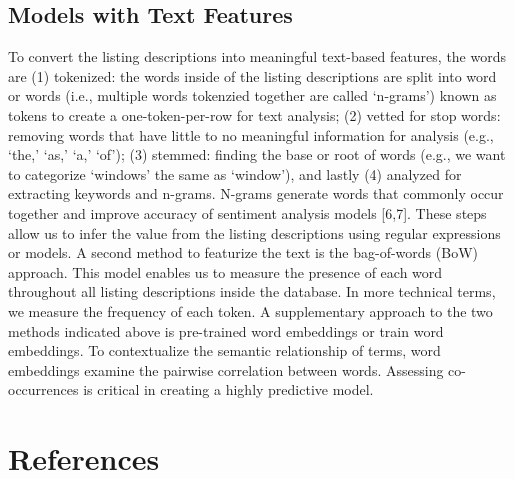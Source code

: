 \documentclass[10pt,letterpaper]{article}
\begin{document}
\hypertarget{models-with-text-features}{%
\subsection{Models with Text Features}\label{models-with-text-features}}

To convert the listing descriptions into meaningful text-based features,
the words are (1) tokenized: the words inside of the listing
descriptions are split into word or words (i.e., multiple words
tokenzied together are called `n-grams') known as tokens to create a
one-token-per-row for text analysis; (2) vetted for stop words: removing
words that have little to no meaningful information for analysis (e.g.,
`the,' `as,' `a,' `of'); (3) stemmed: finding the base or root of words
(e.g., we want to categorize `windows' the same as `window'), and lastly
(4) analyzed for extracting keywords and n-grams. N-grams generate words
that commonly occur together and improve accuracy of sentiment analysis
models {[}6,7{]}. These steps allow us to infer the value from the
listing descriptions using regular expressions or models. A second
method to featurize the text is the bag-of-words (BoW) approach. This
model enables us to measure the presence of each word throughout all
listing descriptions inside the database. In more technical terms, we
measure the frequency of each token. A supplementary approach to the two
methods indicated above is pre-trained word embeddings or train word
embeddings. To contextualize the semantic relationship of terms, word
embeddings examine the pairwise correlation between words. Assessing
co-occurrences is critical in creating a highly predictive model.

\hypertarget{references}{%
\section*{References}\label{references}}
\end{document}
